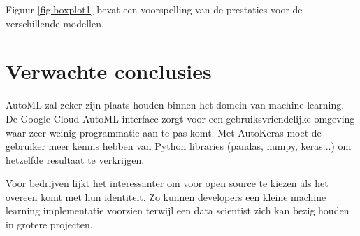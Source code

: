 Figuur \ref{fig:boxplot1} bevat een voorspelling van de prestaties voor de verschillende modellen.

\section{Verwachte conclusies}
\label{sec:verwachte_conclusies}

AutoML zal zeker zijn plaats houden binnen het domein van machine learning. De Google Cloud AutoML interface zorgt voor een gebruiksvriendelijke omgeving waar zeer weinig programmatie aan te pas komt. Met AutoKeras moet de gebruiker meer kennis hebben van Python libraries (pandas, numpy, keras...) om hetzelfde resultaat te verkrijgen. 

Voor bedrijven lijkt het interessanter om voor open source te kiezen als het overeen komt met hun identiteit. Zo kunnen developers een kleine machine learning implementatie voorzien terwijl een data scientist zich kan bezig houden in grotere projecten.

